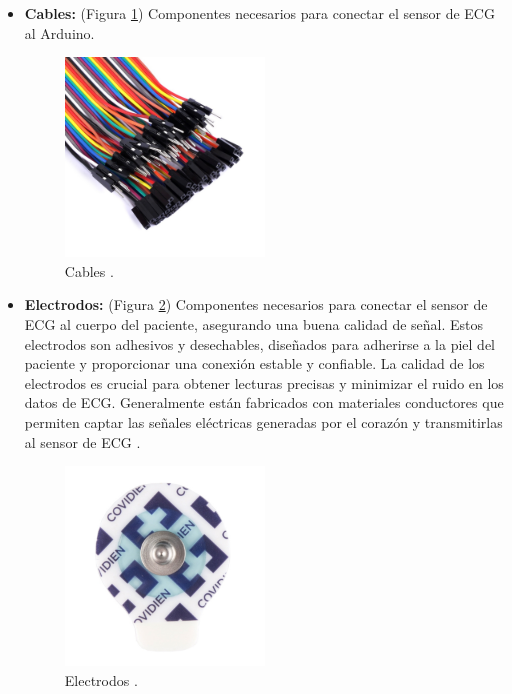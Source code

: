\begin{itemize}
\item \textbf{Cables:} (Figura \ref{fig:Cables
})
Componentes necesarios para conectar el sensor de ECG al Arduino.

\begin{figure}[h]
\centering
\includegraphics[width=0.5\textwidth]{img/cablesarduino.jpg}
\caption{Cables \cite{Cables}.}
\label{fig:Cables
}
\end{figure}
\end{itemize}

\begin{itemize}
\item \textbf{Electrodos:} (Figura \ref{fig:electrodos})
Componentes necesarios para conectar el sensor de ECG al cuerpo del paciente, asegurando una buena calidad de señal. Estos electrodos son adhesivos y desechables, diseñados para adherirse a la piel del paciente y proporcionar una conexión estable y confiable. La calidad de los electrodos es crucial para obtener lecturas precisas y minimizar el ruido en los datos de ECG. Generalmente están fabricados con materiales conductores que permiten captar las señales eléctricas generadas por el corazón y transmitirlas al sensor de ECG \cite{ElectrodosECG}.

\begin{figure}[h]
\centering
\includegraphics[width=0.5\textwidth]{img/electrodo.jpg}
\caption{Electrodos \cite{ElectrodosECGPediatricos}.}
\label{fig:electrodos}
\end{figure}
\end{itemize}


